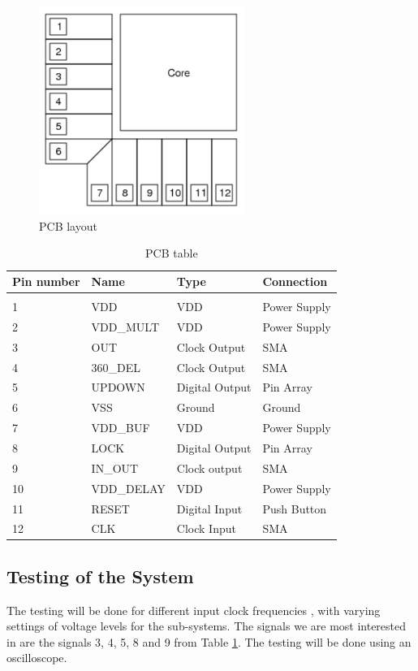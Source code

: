 \documentclass[a4paper,12pt]{article} \usepackage{graphicx}
\begin{document}
\begin{figure} [h!]
\centering
\includegraphics[width=0.6\textwidth]{../Bilder/Layout/PCB.png}
\caption{PCB layout}
\label{fig:PCB}
\end{figure}

\begin{table} [h!]
\begin{tabular}{l  l  l  l}
Pin number & Name & Type & Connection\\ \hline \\
1 & VDD			& VDD				& Power Supply	\\
2 & VDD\_MULT	& VDD				& Power Supply	\\
3 & OUT			& Clock Output		& SMA			\\
4 & 360\_DEL	& Clock Output		& SMA			\\
5 & UPDOWN		& Digital Output	& Pin Array		\\
6 & VSS			& Ground			& Ground		\\
7 & VDD\_BUF	& VDD				& Power Supply	\\
8 & LOCK		& Digital Output	& Pin Array		\\
9 & IN\_OUT		& Clock output		& SMA			\\
10 & VDD\_DELAY	& VDD				& Power Supply	\\
11 & RESET		& Digital Input		& Push Button	\\
12 & CLK		& Clock Input		& SMA
\end{tabular}
\caption{PCB table}
\label{tab:PCB}
\end{table}

\subsection{Testing of the System}
The testing will be done for different input clock frequencies
, with varying settings of voltage levels for the sub-systems. The
signals we are most interested in are the signals 3, 4, 5, 8 and 9
from Table \ref{tab:PCB}. The testing will be done using an oscilloscope.
\end{document}
